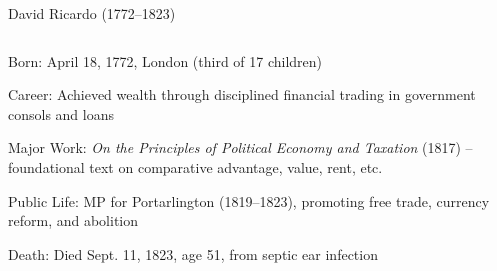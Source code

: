 \documentclass[notes,11pt, aspectratio=169, xcolor=table]{beamer}
\newenvironment{wideitemize}{\itemize\addtolength{\itemsep}{10pt}}{\enditemize}
\begin{document}
\begin{frame}{David Ricardo (1772–1823)}
\begin{columns}
    \begin{column}{0.65\textwidth}
        \begin{wideitemize}
            \item Born: April 18, 1772, London (third of 17 children)
            \item Career: Achieved wealth through disciplined financial trading in government consols and loans
            \item Major Work: \textit{On the Principles of Political Economy and Taxation} (1817) – foundational text on comparative advantage, value, rent, etc.
            \item Public Life: MP for Portarlington (1819–1823), promoting free trade, currency reform, and abolition
            \item Death: Died Sept. 11, 1823, age 51, from septic ear infection
        \end{wideitemize}
    \end{column}
    

\end{columns}
\end{frame}
\end{document}
